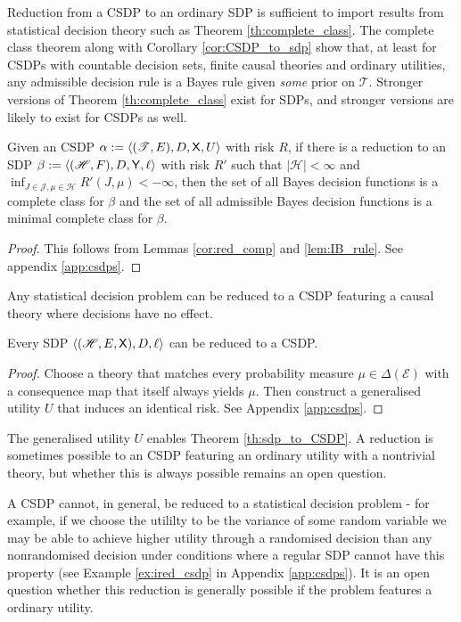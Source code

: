 Reduction from a CSDP to an ordinary SDP is sufficient to import results from statistical decision theory such as Theorem \ref{th:complete_class}. The complete class theorem along with Corollary \ref{cor:CSDP_to_sdp} show that, at least for CSDPs with countable decision sets, finite causal theories and ordinary utilities, any admissible decision rule is a Bayes rule given \emph{some} prior on $\mathscr{T}$. Stronger versions of Theorem \ref{th:complete_class} exist for SDPs, and stronger versions are likely to exist for CSDPs as well.

\begin{theorem}\label{th:complete_class}
Given an CSDP $\alpha:=\langle (\mathscr{T},E),D,\mathsf{X},U\rangle$ with risk $R$, if there is a reduction to an SDP $\beta:=\langle (\mathscr{H},F),D,\mathsf{Y},\ell \rangle$ with risk $R'$ such that $|\mathscr{H}|<\infty$ and $\inf_{J\in\mathscr{J},\mu\in\mathscr{H}} R'(J,\mu)<-\infty$, then the set of all Bayes decision functions is a complete class for $\beta$ and the set of all admissible Bayes decision functions is a minimal complete class for $\beta$.
\end{theorem}

\begin{proof}
This follows from Lemmas \ref{cor:red_comp} and \ref{lem:IB_rule}. See appendix \ref{app:csdps}.
\end{proof}

Any statistical decision problem can be reduced to a CSDP featuring a causal theory where decisions have no effect.

\begin{theorem}\label{th:sdp_to_CSDP}
Every SDP $\langle (\mathscr{H},E,\mathsf{X}),D,\ell\rangle$ can be reduced to a CSDP.
\end{theorem}
\begin{proof}
Choose a theory that matches every probability measure $\mu\in\Delta(\mathcal{E})$ with a consequence map that itself always yields $\mu$. Then construct a generalised utility $U$ that induces an identical risk. See Appendix \ref{app:csdps}.
\end{proof}

The generalised utility $U$ enables Theorem \ref{th:sdp_to_CSDP}. A reduction is sometimes possible to an CSDP featuring an ordinary utility with a nontrivial theory, but whether this is always possible remains an open question.

A CSDP cannot, in general, be reduced to a statistical decision problem - for example, if we choose the utililty to be the variance of some random variable we may be able to achieve higher utility through a randomised decision than any nonrandomised decision under conditions where a regular SDP cannot have this property (see Example \ref{ex:ired_csdp} in Appendix \ref{app:csdps}). It is an open question whether this reduction is generally possible if the problem features a ordinary utility.

